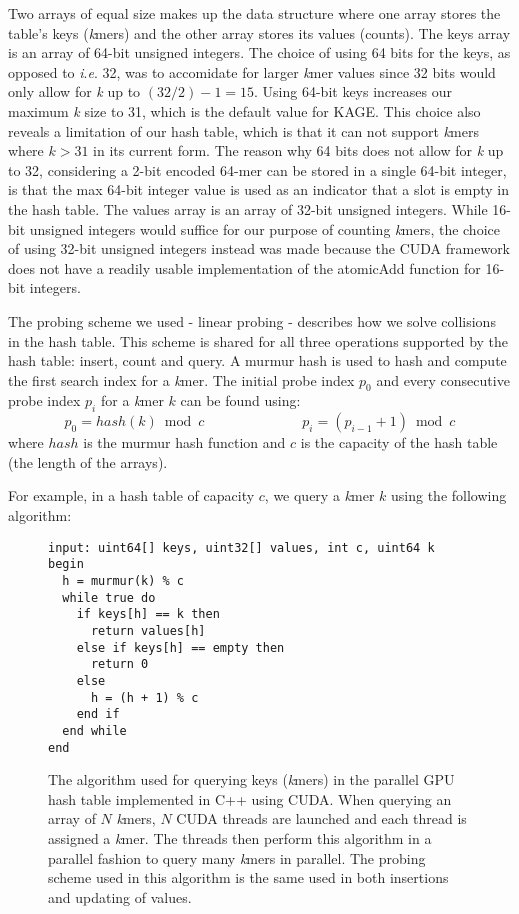 Two arrays of equal size makes up the data structure where one array stores the table's keys (\textit{k}mers) and the other array stores its values (counts).
The keys array is an array of 64-bit unsigned integers.
The choice of using 64 bits for the keys, as opposed to \textit{i}.\textit{e}. 32, was to accomidate for larger \textit{k}mer values since 32 bits would only allow for \textit{k} up to $(32/2)-1=15$.
Using 64-bit keys increases our maximum \textit{k} size to 31, which is the default value for KAGE.
This choice also reveals a limitation of our hash table, which is that it can not support \textit{k}mers where $k>31$ in its current form.
The reason why 64 bits does not allow for \textit{k} up to 32, considering a 2-bit encoded 64-mer can be stored in a single 64-bit integer, is that the max 64-bit integer value is used as an indicator that a slot is empty in the hash table.
The values array is an array of 32-bit unsigned integers.
While 16-bit unsigned integers would suffice for our purpose of counting \textit{k}mers, the choice of using 32-bit unsigned integers instead was made because the CUDA framework does not have a readily usable implementation of the atomicAdd function for 16-bit integers.

The probing scheme we used - linear probing - describes how we solve collisions in the hash table. 
This scheme is shared for all three operations supported by the hash table: insert, count and query.
A murmur hash \cite{murmur} is used to hash and compute the first search index for a \textit{k}mer.
The initial probe index $p_0$ and every consecutive probe index $p_i$ for a \textit{k}mer $k$ can be found using:
\begin{equation}
  p_0=hash(k) \bmod c \hspace{7em} p_{i}=(p_{i-1}+1) \bmod c
\end{equation}
where $hash$ is the murmur hash function and $c$ is the capacity of the hash table (the length of the arrays).

For example, in a hash table of capacity $c$, we query a \textit{k}mer $k$ using the following algorithm:
\begin{figure}[H]
\begin{lstlisting}[style=pseudocode]
input: uint64[] keys, uint32[] values, int c, uint64 k
begin
  h = murmur(k) % c
  while true do
    if keys[h] == k then
      return values[h]
    else if keys[h] == empty then
      return 0
    else
      h = (h + 1) % c
    end if
  end while
end
\end{lstlisting}
\caption{
  The algorithm used for querying keys (\textit{k}mers) in the parallel GPU hash table implemented in C++ using CUDA. 
  When querying an array of $N$ \textit{k}mers, $N$ CUDA threads are launched and each thread is assigned a \textit{k}mer. 
  The threads then perform this algorithm in a parallel fashion to query many \textit{k}mers in parallel.
  The probing scheme used in this algorithm is the same used in both insertions and updating of values.
}
\end{figure}

